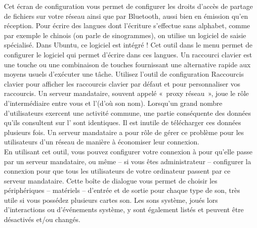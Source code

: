 Cet écran de configuration vous permet de configurer les droits d'accès de partage de fichiers sur votre réseau ainsi que par Bluetooth, aussi bien en émission qu'en réception.
Pour écrire des langues dont l'écriture s'effectue sans alphabet, comme par exemple le chinois (on parle de sinogrammes), on utilise un logiciel de saisie spécialisé. Dans Ubuntu, ce logiciel est intégré ! Cet outil dans le menu permet de configurer le logiciel qui permet d'écrire dans ces langues.
Un raccourci clavier est une touche ou une combinaison de touches fournissant une alternative rapide aux moyens usuels d'exécuter une tâche. Utilisez l'outil de configuration Raccourcis clavier pour afficher les raccourcis clavier par défaut et pour personnaliser vos raccourcis.
Un serveur mandataire, souvent appelé «~proxy réseau~», joue le rôle d'intermédiaire entre vous et l'(d'où son nom). Lorsqu'un grand nombre d'utilisateurs exercent une activité commune, une partie conséquente des données qu'ils consultent sur l' sont identiques. Il est inutile de télécharger ces données plusieurs fois. Un serveur mandataire a pour rôle de gérer ce problème pour les utilisateurs d'un réseau de manière à économiser leur connexion.\\
En utilisant cet outil, vous pouvez configurer votre connexion à  pour qu'elle passe par un serveur mandataire, ou même -- si vous êtes administrateur -- configurer la connexion pour que tous les utilisateurs de votre ordinateur passent par ce serveur mandataire.
Cette boîte de dialogue vous permet de choisir les périphériques -- matériels -- d'entrée et de sortie pour chaque type de son, très utile si vous possédez plusieurs cartes son. Les sons système, joués lors d'interactions ou d'événements système, y sont également listés et peuvent être désactivés et/ou changés.
